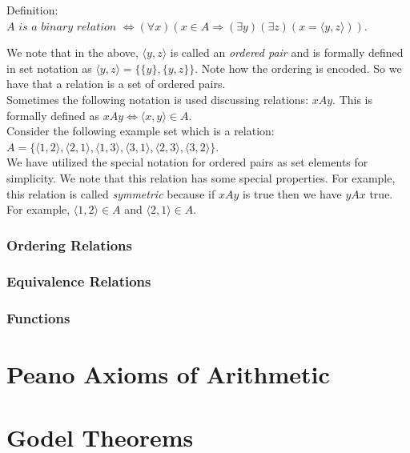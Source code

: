 Definition:  $A \textit{ is a binary relation } \Longleftrightarrow (\forall x) (x \in A \Longrightarrow (\exists y)(\exists z)(x=\langle y,z \rangle))$.

We note that in the above, $\langle y, z \rangle$ is called an \textit{ordered pair} and is formally defined in set notation as $\langle y, z \rangle = \{\{y\}, \{y,z\}\}$.  Note how the ordering is encoded.  So we have that a relation is a set of ordered pairs.\\

Sometimes the following notation is used discussing relations: $x A y$.  This is formally defined as $x A y \Longleftrightarrow \langle x,y \rangle \in A$.\\

Consider the following example set which is a relation:  $A=\{\langle 1,2 \rangle, \langle 2,1 \rangle,  \langle 1,3 \rangle,  \langle 3,1 \rangle,  \langle 2,3 \rangle,  \langle 3,2 \rangle \}$. \\

We have utilized the special notation for ordered pairs as set elements for simplicity.  We note that this relation has some special properties.  For example, this relation is called \textit{symmetric} because if $xAy$ is true then we have $yAx$ true.  For example, $\langle 1, 2 \rangle \in A $ and $\langle 2, 1 \rangle \in A$.

\subsubsection{Ordering Relations}

\subsubsection{Equivalence Relations}

\subsubsection{Functions}


\section{Peano Axioms of Arithmetic}

\section{Godel Theorems}